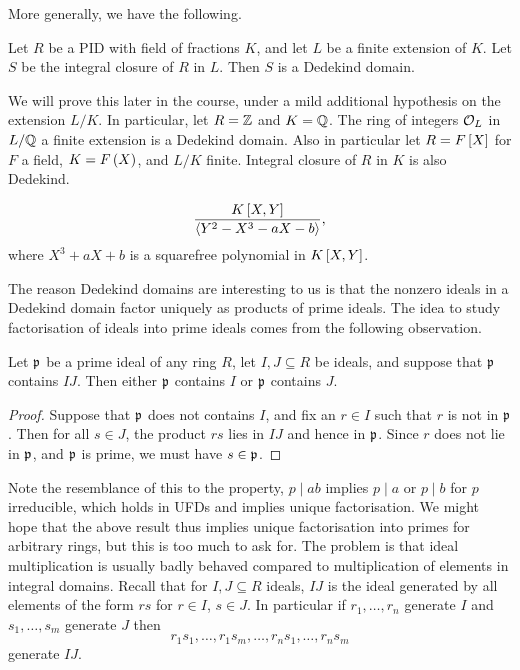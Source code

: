 More generally, we have the following.

\begin{theorem}
Let $ R $ be a PID with field of fractions $ K $, and let $ L $ be a finite extension of $ K $. Let $ S $ be the integral closure of $ R $ in $ L $. Then $ S $ is a Dedekind domain.
\end{theorem}

We will prove this later in the course, under a mild additional hypothesis on the extension $ L / K $. In particular, let $ R = \Z $ and $ K = \Q $. The ring of integers $ \OO_L $ in $ L / \Q $ a finite extension is a Dedekind domain. Also in particular let $ R = F\sb{X} $ for $ F $ a field, $ K = F\rb{X} $, and $ L / K $ finite. Integral closure of $ R $ in $ K $ is also Dedekind.

\begin{example*}
$$ \dfrac{K\sb{X, Y}}{\ab{Y^2 - X^3 - aX - b}}, $$
where $ X^3 + aX + b $ is a squarefree polynomial in $ K\sb{X, Y} $.
\end{example*}

The reason Dedekind domains are interesting to us is that the nonzero ideals in a Dedekind domain factor uniquely as products of prime ideals. The idea to study factorisation of ideals into prime ideals comes from the following observation.

\begin{lemma}
\label{lem:11.1.3}
Let $ \pp $ be a prime ideal of any ring $ R $, let $ I, J \subseteq R $ be ideals, and suppose that $ \pp $ contains $ IJ $. Then either $ \pp $ contains $ I $ or $ \pp $ contains $ J $.
\end{lemma}

\begin{proof}
Suppose that $ \pp $ does not contains $ I $, and fix an $ r \in I $ such that $ r $ is not in $ \pp $. Then for all $ s \in J $, the product $ rs $ lies in $ IJ $ and hence in $ \pp $. Since $ r $ does not lie in $ \pp $, and $ \pp $ is prime, we must have $ s \in \pp $.
\end{proof}

Note the resemblance of this to the property, $ p \mid ab $ implies $ p \mid a $ or $ p \mid b $ for $ p $ irreducible, which holds in UFDs and implies unique factorisation. We might hope that the above result thus implies unique factorisation into primes for arbitrary rings, but this is too much to ask for. The problem is that ideal multiplication is usually badly behaved compared to multiplication of elements in integral domains. Recall that for $ I, J \subseteq R $ ideals, $ IJ $ is the ideal generated by all elements of the form $ rs $ for $ r \in I $, $ s \in J $. In particular if $ r_1, \dots, r_n $ generate $ I $ and $ s_1, \dots, s_m $ generate $ J $ then
$$ r_1s_1, \dots, r_1s_m, \dots, r_ns_1, \dots, r_ns_m $$
generate $ IJ $.

